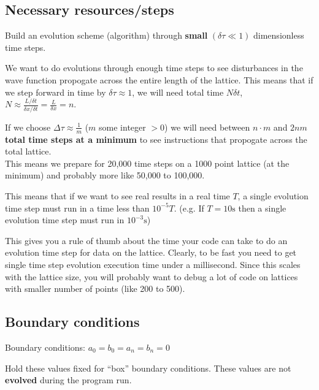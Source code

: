 \documentclass[11pt,letterpaper]{article}
\begin{document}
	\subsection{Necessary resources/steps}
	\begin{description}[leftmargin=6em,style=nextline]
		\item[Next] Build an evolution scheme (algorithm) through \textbf{small} $(\delta \tau \ll 1)$ dimensionless time steps.
		\item[Tradeoff] We want to do evolutions through enough time steps to see disturbances in the wave function propogate across the entire length of the lattice. This means that if we step forward in time by $\delta \tau \approx 1$, we will need total time $N\delta t$, $N \approx \frac{L/\delta t}{\delta x / \delta t} = \frac{L}{\delta x} = n$.\par
	\end{description}
	If we choose $\Delta \tau \approx \frac{1}{m}$ ($m$ some integer $> 0$) we will need between $n \cdot m$ and \textbf{$2nm$ total time steps at a minimum} to see instructions that propogate across the total lattice.\\
	This means we prepare for 20,000 time steps on a 1000 point lattice (at the minimum) and probably more like 50,000 to 100,000.\par
	This means that if we want to see real results in a real time $T$, a single evolution time step must run in a time less than $10^{-5} T$. (e.g. If $T=10\si{\second}$ then a single evolution time step must run in $10^{-3}\si{\second}$)\par
	This gives you a rule of thumb about the time your code can take to do an evolution time step for data on the lattice. Clearly, to be fast you need to get single time step evolution execution time under a millisecond. Since this scales with the lattice size, you will probably want to debug a lot of code on lattices with smaller number of points (like 200 to 500).
	\subsection{Boundary conditions}
	Boundary conditions: $a_0=b_0=a_n=b_n=0$\par
	Hold these values fixed for ``box'' boundary conditions. These values are not \textbf{evolved} during the program run.
\end{document}
